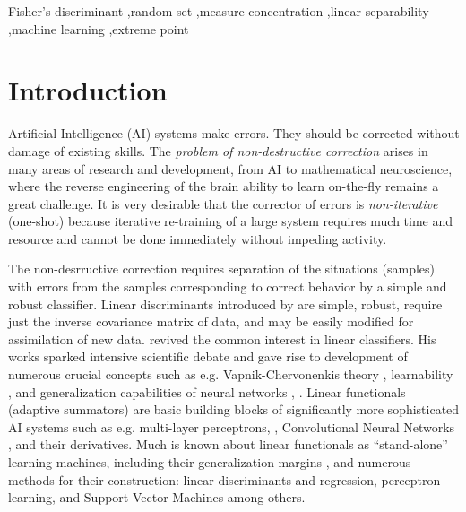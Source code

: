 \documentclass[final,5p,times,twocolumn]{elsarticle}
\begin{document}
\begin{frontmatter}
\begin{keyword}
 Fisher's discriminant \sep random set  \sep measure concentration \sep linear separability \sep machine learning \sep extreme point


\end{keyword}

\end{frontmatter}


\section{Introduction}


Artificial Intelligence (AI) systems make errors. They should be corrected without damage of existing skills. The  {\em problem of non-destructive correction} arises in many areas of research and development, from AI to mathematical neuroscience, where the reverse engineering of the brain ability to learn on-the-fly remains a great challenge. It is very desirable that the corrector of errors is {\em non-iterative} (one-shot) because iterative re-training of a large system requires much time and resource and cannot be done immediately without impeding activity.

The non-desrructive correction requires separation of the situations (samples) with errors from the samples corresponding to correct behavior by a simple and robust classifier. Linear discriminants introduced by \cite{Fisher1936} are simple, robust, require just the inverse covariance matrix of data, and may be easily modified for assimilation of new data. \cite{Rosenblatt1962} revived the common interest in linear classifiers.
His works sparked intensive scientific debate \citep{Minsky} and gave rise to development of numerous crucial concepts such as e.g. Vapnik-Chervonenkis theory \citep{Vapnik1971}, learnability \citep{Natarajan1989}, and generalization capabilities of neural networks \citep{Vapnik2000}, \citep{Bousquet2002}.
Linear functionals (adaptive summators) are  basic building blocks of significantly more sophisticated AI systems such as e.g. multi-layer perceptrons, \citep{PDP1986}, Convolutional Neural Networks \citep{CNN1995}, \citep{DeepLearning2015} and their derivatives. Much is known about linear functionals as ``stand-alone'' learning machines, including their generalization margins \citep{Frend1999}, \citep{Vapnik2000} and numerous methods for their construction:  linear discriminants  and regression, perceptron learning, and Support Vector Machines \citep{Vapnik1982} among others.
\end{document}
